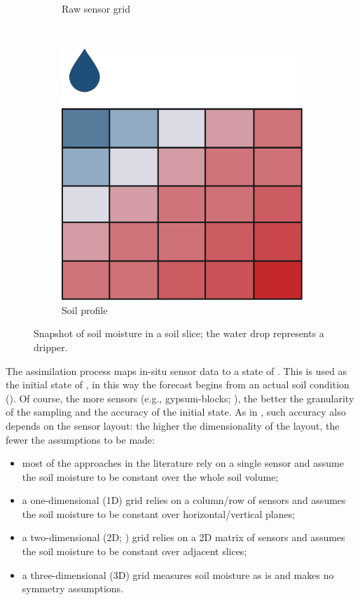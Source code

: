\begin{figure}[t]
\begin{subfigure}[t]{.3\textwidth}
\caption{Raw sensor grid}
\label{orchard-fig:moisture-sens}
\end{subfigure}
~
\begin{subfigure}[t]{.3\textwidth}
\centering
\includegraphics[scale=.15]{chapters/physics-aware/orchard/img/soil-moisture-profile.pdf}
\caption{Soil profile}
\label{orchard-fig:moisture-profile}
\end{subfigure}
\caption{Snapshot of soil moisture in a soil slice; the water drop represents a dripper.}
\label{orchard-fig:moisture}
\end{figure}

The assimilation process maps in-situ sensor data to a state of \olab{}.
This is used as the initial state of \olab{}, in this way the forecast begins from an actual soil condition ().
Of course, the more sensors (e.g., gypsum-blocks; ), the better the granularity of the sampling and the accuracy of the initial state.
As in , such accuracy also depends on the sensor layout: the higher the dimensionality of the layout, the fewer the assumptions to be made:
\begin{itemize}
    \item most of the approaches in the literature rely on a single sensor and assume the soil moisture to be constant over the whole soil volume;
    \item a one-dimensional (1D) grid relies on a column/row of sensors and assumes the soil moisture to be constant over horizontal/vertical planes;
    \item a two-dimensional (2D; ) grid relies on a 2D matrix of sensors and assumes the soil moisture to be constant over adjacent slices;
    \item a three-dimensional (3D) grid measures soil moisture as is and makes no symmetry assumptions.
\end{itemize}

